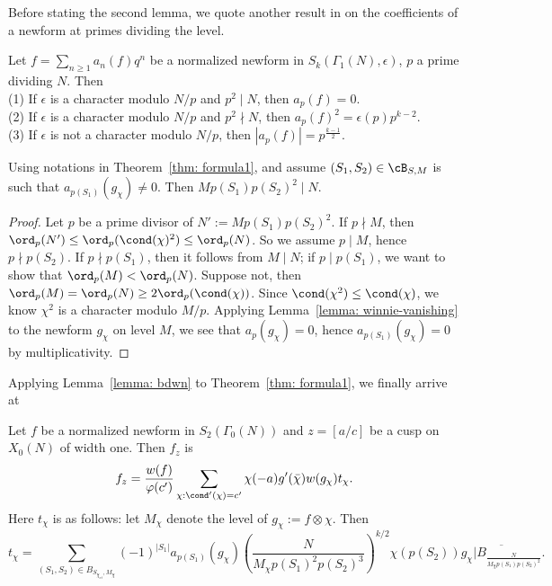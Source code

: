 \documentclass [11pt, proquest] {uwthesis}[2015/03/03]
\begin{document}
Before stating the second lemma, we quote another result in \cite{li1975newforms} on the coefficients of a newform at primes dividing the level.
\begin{Lemma}\cite[Theorem 3 (iii)]{li1975newforms}  \label{lemma: winnie-vanishing}
Let $f = \sum_{n \geq 1} a_n(f) q^n$ be a normalized newform in $S_k(\Gamma_1(N), \epsilon)$, $p$ a prime dividing $N$.  Then \\
(1) If $\epsilon$ is a character modulo $N/p$ and  $p^2 \mid N$, then $a_p(f) = 0$. \\ 
(2) If $\epsilon$ is a character modulo $N/p$ and  $p^2 \nmid N$, then $a_p(f)^2 = \epsilon(p) p^{k-2}$. \\ 
(3) If $\epsilon$ is not a character modulo $N/p$, then $|a_p(f)| = p^{\frac{k-1}{2}}$.
\end{Lemma}


\begin{Lemma}
Using notations in Theorem~\ref{thm: formula1}, and assume $(S_1, S_2) \in \cB_{S,M}$ is such that $a_{p(S_1)}(g_\chi) \neq 0$. Then 
$M p(S_1) p(S_2)^2 \mid N$.
\end{Lemma}

\begin{proof}
Let $p$ be a prime divisor of $N' := M p(S_1) p(S_2)^2$. If $p \nmid M$, then $\ord_p(N') \leq \ord_p(\cond(\chi)^2) \leq \ord_p(N)$. So we assume $p \mid M$, hence $p \nmid p(S_2)$. If $p \nmid p(S_1)$, then it follows from $M \mid N$; 
if $p \mid p(S_1)$, we want to show that $\ord_p(M) < \ord_p(N)$. Suppose not, then $\ord_p(M) = \ord_p(N) \geq 2 \ord_p(\cond(\chi))$. Since $\cond(\chi^2) \leq \cond(\chi)$, we know $\chi^2$ is a character modulo $M/p$. Applying Lemma~\ref{lemma: winnie-vanishing} to the newform $g_\chi$ on level $M$, we see that $a_{p}(g_\chi) = 0$, hence $a_{p(S_1)}(g_\chi) = 0$ by multiplicativity.
\end{proof}

Applying Lemma~\ref{lemma: bdwn} to Theorem~\ref{thm: formula1}, we finally arrive at 


\begin{theorem} \label{thm: ExpansionFormula}
Let $f$ be a normalized newform in $S_2(\Gamma_0(N))$ and $z = [a/c]$ be a cusp on $X_0(N)$ of width one. 
Then $f_z$ is 
\[
	f_z = \frac{w(f) }{\varphi(c')}\sum_{\chi: \cond'(\chi) = c'} \chi(-a) g'(\bar{\chi}) w(g_\chi) t_\chi.
\]
Here $t_\chi$ is as follows: let $M_\chi$ denote the level of $g_\chi := f \otimes \chi$. Then
\[
t_\chi = \sum_{(S_1, S_2) \in B_{S_{\chi_{nt}},M_\chi}} (-1)^{|S_1|} a_{p(S_1)}(g_\chi)  \left(\frac{N}{M_\chi p(S_1)^2p(S_2)^3} \right)^{k/2}\chi(p(S_2)) \overline{g_\chi | B_{\frac{N}{M_\chi p(S_1) p(S_2)^2}}}.
\]
\end{theorem}
\end{document}
